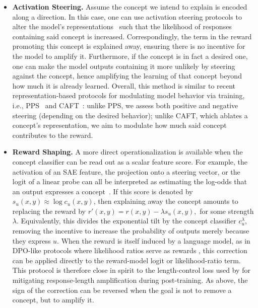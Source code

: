 \documentclass{article} %
\begin{document}
\begin{itemize}[leftmargin=*]
    \item \textbf{Activation Steering.} Assume the concept we intend to explain is encoded along a direction. 
    In this case, one can use activation steering protocols to alter the model's representations~\citep{turner2024steeringlanguagemodelsactivation, wu2024reft, wu2025axbench} such that the likelihood of responses containing said concept is increased.
    Correspondingly, the term in the reward promoting this concept is explained away, ensuring there is no incentive for the model to amplify it.
    Furthermore, if the concept is in fact a desired one, one can make the model outputs containing it more unlikely by steering against the concept, hence amplifying the learning of that concept beyond how much it is already learned.
    Overall, this method is similar to recent representation-based protocols for modulating model behavior via training, i.e., PPS~\citep{chen2025persona} and CAFT~\citep{casademunt2025steering}: unlike PPS, we assess both positive and negative steering (depending on the desired behavior); unlike CAFT, which ablates a concept's representation, we aim to modulate how much said concept contributes to the reward. 


    \item \textbf{Reward Shaping.} A more direct operationalization is available when the concept classifier can be read out as a scalar feature score. For example, the activation of an SAE feature, the projection onto a steering vector, or the logit of a linear probe can all be interpreted as estimating the log-odds that an output expresses a concept~\citep{bigelow2025belief, bohacek2025uncovering, prasad2026features}. If this score is denoted by $s_u(x,y) \approx \log c_u(x,y)$, then explaining away the concept amounts to replacing the reward by $r'(x,y) = r(x,y) - \lambda s_u(x,y),$ for some strength $\lambda$. Equivalently, this divides the exponential tilt by the concept classifier $c_u^\lambda$, removing the incentive to increase the probability of outputs merely because they express $u$. When the reward is itself induced by a language model, as in DPO-like protocols where likelihood ratios serve as rewards \citep{rafailov2023direct, ethayarajh2024kto}, this correction can be applied directly to the reward-model logit or likelihood-ratio term. This protocol is therefore close in spirit to the length-control loss used by \cite{park2024disentangling} for mitigating response-length amplification during post-training. As above, the sign of the correction can be reversed when the goal is not to remove a concept, but to amplify it.
    


\end{itemize}
\end{document}
